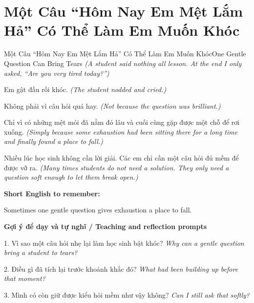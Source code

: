 \section{Một Câu “Hôm Nay Em Mệt Lắm Hả” Có Thể Làm Em Muốn Khóc}
\begin{truyen}{Một Câu “Hôm Nay Em Mệt Lắm Hả” Có Thể Làm Em Muốn Khóc}{One Gentle Question Can Bring Tears}
\textit{(A student said nothing all lesson. At the end I only asked, “Are you very tired today?”)}

Em gật đầu rồi khóc.
\textit{(The student nodded and cried.)}

Không phải vì câu hỏi quá hay.
\textit{(Not because the question was brilliant.)}

Chỉ vì có những mệt mỏi đã nằm đó lâu và cuối cùng gặp được một chỗ để rơi xuống.
\textit{(Simply because some exhaustion had been sitting there for a long time and finally found a place to fall.)}

\end{truyen}

\begin{baihoc}
Nhiều lúc học sinh không cần lời giải. Các em chỉ cần một câu hỏi đủ mềm để được vỡ ra.
\textit{(Many times students do not need a solution. They only need a question soft enough to let them break open.)}
\end{baihoc}

\begin{ghinhoanh}
\textbf{Short English to remember:}

Sometimes one gentle question gives exhaustion a place to fall.

\end{ghinhoanh}

\begin{tuhocnhanh}
\textbf{Gợi ý để dạy và tự nghĩ / Teaching and reflection prompts}

1. Vì sao một câu hỏi nhẹ lại làm học sinh bật khóc? \textit{Why can a gentle question bring a student to tears?}

2. Điều gì đã tích lại trước khoảnh khắc đó? \textit{What had been building up before that moment?}

3. Mình có còn giữ được kiểu hỏi mềm như vậy không? \textit{Can I still ask that softly?}
\end{tuhocnhanh}
\ngancach

